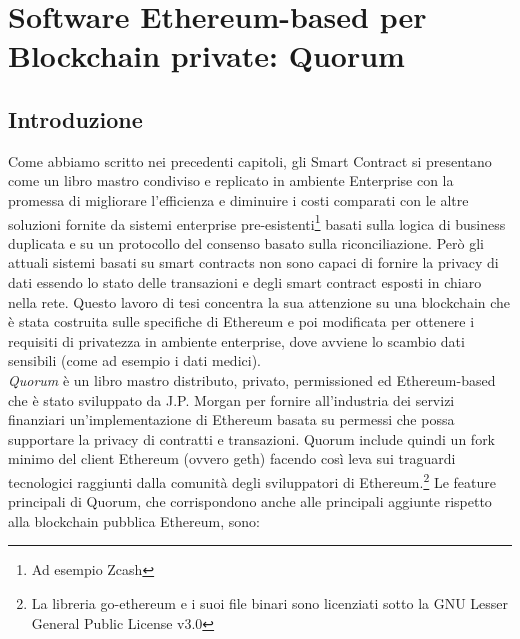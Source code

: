 %
%
\chapter{Software Ethereum-based per Blockchain private: Quorum}
%
\label{cap:quorum}
%
%
\section{Introduzione}
%
Come abbiamo scritto nei precedenti capitoli, gli Smart Contract si presentano come un libro mastro condiviso e replicato in ambiente Enterprise con la promessa di migliorare l'efficienza e diminuire i costi comparati con le altre soluzioni fornite da sistemi enterprise pre-esistenti\footnote{Ad esempio Zcash} basati sulla logica di business duplicata e su un protocollo del consenso basato sulla riconciliazione. Però gli attuali sistemi basati su smart contracts non sono capaci di fornire la privacy di dati essendo lo stato delle transazioni e degli smart contract esposti in chiaro nella rete. Questo lavoro di tesi concentra la sua attenzione su una blockchain che è stata costruita sulle specifiche di Ethereum e poi modificata per ottenere i requisiti di privatezza in ambiente enterprise, dove avviene lo scambio dati sensibili (come ad esempio i dati medici).\\
\emph{Quorum}\autocite{website:quorum} è un libro mastro distributo, privato, permissioned ed Ethereum-based che è stato sviluppato da J.P. Morgan per fornire all'industria dei servizi finanziari un'implementazione di Ethereum basata su permessi che possa supportare la privacy di contratti e transazioni. Quorum include quindi un fork minimo del client Ethereum (ovvero geth) facendo così leva sui traguardi tecnologici raggiunti dalla comunità degli sviluppatori di Ethereum.\footnote{ La libreria go-ethereum e i suoi file binari sono licenziati sotto la GNU Lesser General Public License v3.0} Le feature principali di Quorum, che corrispondono anche alle principali aggiunte rispetto alla blockchain pubblica Ethereum, sono:
